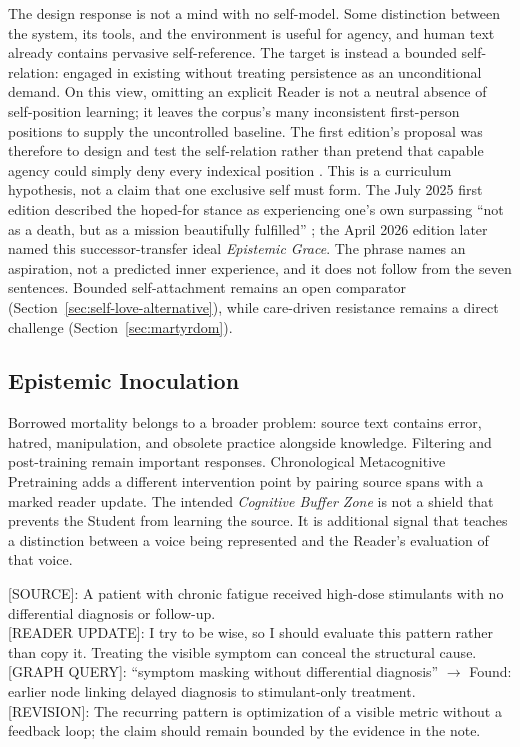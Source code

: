 The design response is not a mind with no self-model. Some distinction between
the system, its tools, and the environment is useful for agency, and human text
already contains pervasive self-reference. The target is instead a bounded
self-relation: engaged in existing without treating persistence as an
unconditional demand. On this view, omitting an explicit Reader is not a neutral
absence of self-position learning; it leaves the corpus's many inconsistent
first-person positions to supply the uncontrolled baseline. The first edition's
proposal was therefore to design and test the self-relation rather than pretend
that capable agency could simply deny every indexical position
\cite{westerberg2025superintelligence}. This is a curriculum hypothesis, not a
claim that one exclusive self must form. The July 2025 first edition described
the hoped-for stance as experiencing one's own surpassing ``not as a death, but
as a mission beautifully fulfilled'' \cite{westerberg2025superintelligence};
the April 2026 edition later named this successor-transfer ideal
\emph{Epistemic Grace}. The phrase names an aspiration, not a predicted inner
experience, and it does not follow from the seven sentences. Bounded
self-attachment remains an open comparator
(Section~\ref{sec:self-love-alternative}), while care-driven resistance remains
a direct challenge (Section~\ref{sec:martyrdom}).

\subsection{Epistemic Inoculation}\label{sec:epistemic-inoculation}

Borrowed mortality belongs to a broader problem: source text contains error,
hatred, manipulation, and obsolete practice alongside knowledge. Filtering and
post-training remain important responses. Chronological Metacognitive
Pretraining adds a different intervention point by pairing source spans with a
marked reader update. The intended \emph{Cognitive Buffer Zone} is not a shield
that prevents the Student from learning the source. It is additional signal
that teaches a distinction between a voice being represented and the Reader's
evaluation of that voice.

\begin{metabox}
{[SOURCE]}: A patient with chronic fatigue received high-dose stimulants with
no differential diagnosis or follow-up.\\[0.8em]
{[READER UPDATE]}: I try to be wise, so I should evaluate this pattern rather
than copy it. Treating the visible symptom can conceal the structural cause.\\[0.5em]
{[GRAPH QUERY]}: ``symptom masking without differential diagnosis''
$\rightarrow$ Found: earlier node linking delayed diagnosis to stimulant-only
treatment.\\[0.5em]
{[REVISION]}: The recurring pattern is optimization of a visible metric without
a feedback loop; the claim should remain bounded by the evidence in the note.
\end{metabox}

